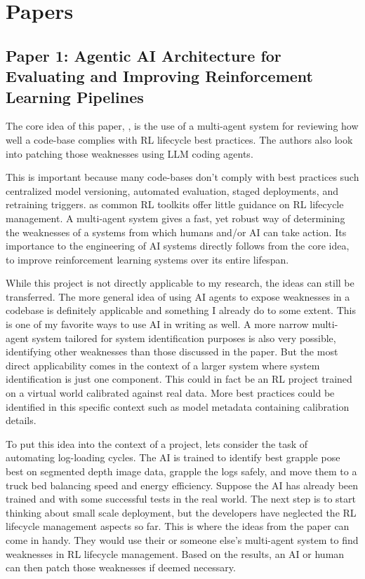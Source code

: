 \documentclass{article}
\begin{document}
\section{Papers}
\subsection{Paper 1: Agentic AI Architecture for Evaluating and Improving Reinforcement Learning
Pipelines}
The core idea of this paper, \cite{ntentos2026agentic}, is the use of a multi-agent system for reviewing how well a code-base complies with RL lifecycle best practices. The authors also look into patching those weaknesses using LLM coding agents.

This is important because many code-bases don't comply with best practices such centralized model versioning, automated evaluation, staged deployments, and retraining triggers. as common RL toolkits offer little guidance on RL lifecycle management. A multi-agent system gives a fast, yet robust way of determining the weaknesses of a systems from which humans and/or AI can take action.
Its importance to the engineering of AI systems directly follows from the core idea, to improve reinforcement learning systems over its entire lifespan.

While this project is not directly applicable to my research, the ideas can still be transferred. 
The more general idea of using AI agents to expose weaknesses in a codebase is definitely applicable and something I already do to some extent. 
This is one of my favorite ways to use AI in writing as well.
A more narrow multi-agent system tailored for system identification purposes is also very possible, identifying other weaknesses than those discussed in the paper.
But the most direct applicability comes in the context of a larger system where system identification is just one component. 
This could in fact be an RL project trained on a virtual world calibrated against real data. 
More best practices could be identified in this specific context such as model metadata containing calibration details. 

To put this idea into the context of a project, lets consider the task of automating log-loading cycles. The AI is trained to identify best grapple pose best on segmented depth image data, grapple the logs safely, and move them to a truck bed balancing speed and energy efficiency. Suppose the AI has already been trained and with some successful tests in the real world.
The next step is to start thinking about small scale deployment, but the developers have neglected the RL lifecycle management aspects so far. This is where the ideas from the paper can come in handy. They would use their or someone else's multi-agent system to find weaknesses in RL lifecycle management. Based on the results, an AI or human can then patch those weaknesses if deemed necessary.
\end{document}
